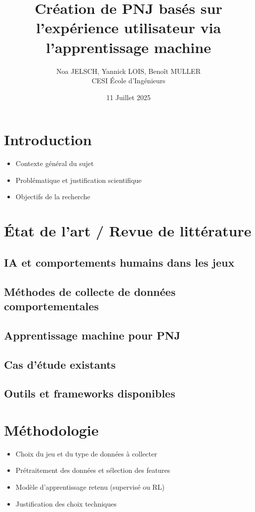 \documentclass[12pt,a4paper]{article}
\title{Création de PNJ basés sur l'expérience utilisateur via l'apprentissage machine}
\author{Noa JELSCH, Yannick LOIS, Benoît MULLER\\CESI École d'Ingénieurs}
\date{11 Juillet 2025}
\begin{document}
\maketitle
\tableofcontents
\newpage

\section{Introduction}
\begin{itemize}
    \item Contexte général du sujet
    \item Problématique et justification scientifique
    \item Objectifs de la recherche
\end{itemize}

\section{État de l'art / Revue de littérature}
\subsection{IA et comportements humains dans les jeux}
\subsection{Méthodes de collecte de données comportementales}
\subsection{Apprentissage machine pour PNJ}
\subsection{Cas d'étude existants}
\subsection{Outils et frameworks disponibles}

\section{Méthodologie}
\begin{itemize}
    \item Choix du jeu et du type de données à collecter
    \item Prétraitement des données et sélection des features
    \item Modèle d'apprentissage retenu (supervisé ou RL)
    \item Justification des choix techniques
\end{itemize}
\end{document}
